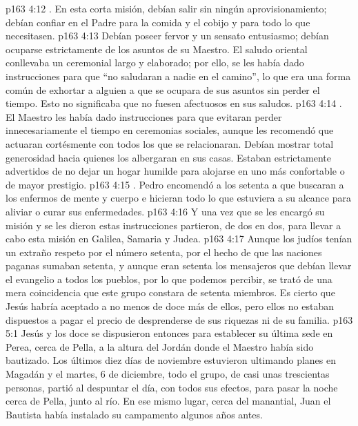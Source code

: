 \vs p163 4:12 . En esta corta misión, debían salir sin ningún aprovisionamiento; debían confiar en el Padre para la comida y el cobijo y para todo lo que necesitasen.
\vs p163 4:13  Debían poseer fervor y un sensato entusiasmo; debían ocuparse estrictamente de los asuntos de su Maestro. El saludo oriental conllevaba un ceremonial largo y elaborado; por ello, se les había dado instrucciones para que “no saludaran a nadie en el camino”, lo que era una forma común de exhortar a alguien a que se ocupara de sus asuntos sin perder el tiempo. Esto no significaba que no fuesen afectuosos en sus saludos.
\vs p163 4:14 . El Maestro les había dado instrucciones para que evitaran perder innecesariamente el tiempo en ceremonias sociales, aunque les recomendó que actuaran cortésmente con todos los que se relacionaran. Debían mostrar total generosidad hacia quienes los albergaran en sus casas. Estaban estrictamente advertidos de no dejar un hogar humilde para alojarse en uno más confortable o de mayor prestigio.
\vs p163 4:15 . Pedro encomendó a los setenta a que buscaran a los enfermos de mente y cuerpo e hicieran todo lo que estuviera a su alcance para aliviar o curar sus enfermedades.
\vs p163 4:16 \pc Y una vez que se les encargó su misión y se les dieron estas instrucciones partieron, de dos en dos, para llevar a cabo esta misión en Galilea, Samaria y Judea.
\vs p163 4:17 Aunque los judíos tenían un extraño respeto por el número setenta, por el hecho de que las naciones paganas sumaban setenta, y aunque eran setenta los mensajeros que debían llevar el evangelio a todos los pueblos, por lo que podemos percibir, se trató de una mera coincidencia que este grupo constara de setenta miembros. Es cierto que Jesús habría aceptado a no menos de doce más de ellos, pero ellos no estaban dispuestos a pagar el precio de desprenderse de sus riquezas ni de su familia.
\vs p163 5:1 Jesús y los doce se dispusieron entonces para establecer su última sede en Perea, cerca de Pella, a la altura del Jordán donde el Maestro había sido bautizado. Los últimos diez días de noviembre estuvieron ultimando planes en Magadán y el martes, 6 de diciembre, todo el grupo, de casi unas trescientas personas, partió al despuntar el día, con todos sus efectos, para pasar la noche cerca de Pella, junto al río. En ese mismo lugar, cerca del manantial, Juan el Bautista había instalado su campamento algunos años antes.
